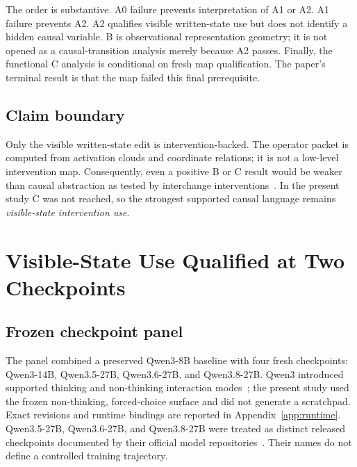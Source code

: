 \documentclass[10pt,a4paper]{article}
\begin{document}
The order is substantive. A0 failure prevents interpretation of A1 or A2. A1 failure prevents A2. A2 qualifies visible written-state use but does not identify a hidden causal variable. B is observational representation geometry; it is not opened as a causal-transition analysis merely because A2 passes. Finally, the functional C analysis is conditional on fresh map qualification. The paper's terminal result is that the map failed this final prerequisite.



\subsection{Claim boundary}

Only the visible written-state edit is intervention-backed. The operator packet is computed from activation clouds and coordinate relations; it is not a low-level intervention map. Consequently, even a positive B or C result would be weaker than causal abstraction as tested by interchange interventions~\cite{geiger2021,geiger2023das}. In the present study C was not reached, so the strongest supported causal language remains \emph{visible-state intervention use}.

\section{Visible-State Use Qualified at Two Checkpoints}
\label{sec:behavior}

\subsection{Frozen checkpoint panel}

The panel combined a preserved Qwen3-8B baseline with four fresh checkpoints: Qwen3-14B, Qwen3.5-27B, Qwen3.6-27B, and Qwen3.8-27B. Qwen3 introduced supported thinking and non-thinking interaction modes~\cite{yang2025qwen3}; the present study used the frozen non-thinking, forced-choice surface and did not generate a scratchpad. Exact revisions and runtime bindings are reported in Appendix~\ref{app:runtime}. Qwen3.5-27B, Qwen3.6-27B, and Qwen3.8-27B were treated as distinct released checkpoints documented by their official model repositories~\cite{qwen35card,qwen36card,qwen38card}. Their names do not define a controlled training trajectory.
\end{document}
